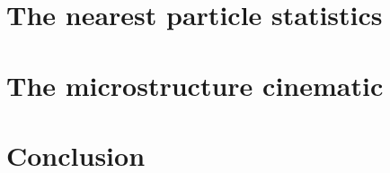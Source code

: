 \documentclass[11pt]{My_preprint}
\begin{document}
\section{The nearest particle statistics}


\section{The microstructure cinematic}
\label{sec:age}


% 

\section{Conclusion}


\appendix


% 
% 


\end{document}
